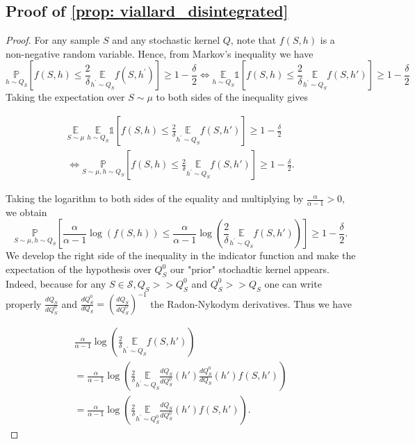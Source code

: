 \begin{noaddcontents}
\subsection{Proof of \cref{prop: viallard_disintegrated} }


\begin{proof}[Proof]
 For any sample $S$ and any stochastic kernel $Q$, note that $f(S,h)$ is a non-negative random variable. Hence, from Markov's inequality we have
$$
\underset{h \sim Q_{S}}{\mathbb{P}}\left[f(S,h) \leq \frac{2}{\delta} \underset{h^{\prime} \sim Q_{S}}{\mathbb{E}} f\left( S,h^{\prime}\right)\right] \geq 1-\frac{\delta}{2} \Longleftrightarrow
\underset{h \sim Q_{S}}{\mathbb{E}} \mathds{1}\left[f(S,h) \leq \frac{2}{\delta} \underset{h^{\prime} \sim Q_{S}}{\mathbb{E}} f\left(S,h'\right)\right] \geq 1-\frac{\delta}{2}
$$
Taking the expectation over $S \sim \mu$ to both sides of the inequality gives

\begin{multline*}
\underset{S \sim \mu}{\mathbb{E}}\; \underset{h \sim Q_{S}}{\mathbb{E}} \mathds{1}\left[f(S,h) \leq \frac{2}{\delta} \underset{h^{\prime} \sim Q_{S}}{\mathbb{E}} f(S,h')\right] \geq 1-\frac{\delta}{2} \\
\Longleftrightarrow
\underset{S \sim \mu, h \sim Q_{S}}{\mathbb{P}}\left[f(S,h) \leq \frac{2}{\delta} \underset{h^{\prime} \sim Q_{S}}{\mathbb{E}} f(S,h')\right] \geq 1-\frac{\delta}{2}.
\end{multline*}

Taking the logarithm to both sides of the equality and multiplying by $\frac{\alpha}{\alpha-1}>0$, we obtain
$$
\underset{S \sim \mu, h \sim Q_{S}}{\mathbb{P}}\left[\frac{\alpha}{\alpha-1} \log (f(S,h)) \leq \frac{\alpha}{\alpha-1} \log \left(\frac{2}{\delta} \underset{h^{\prime} \sim Q_{S}}{\mathbb{E}} f(S,h')\right)\right] \geq 1-\frac{\delta}{2} .
$$
We develop the right side of the inequality in the indicator function and make the expectation of the hypothesis over $Q_S^0$ our "prior" stochadtic kernel appears. Indeed, because for any $S\in\mathcal{S}, Q_S>> Q_S^0$ and $Q_S^0>> Q_S$ one can write properly $\frac{dQ_S}{dQ_S^0}$ and $ \frac{dQ_S^0}{dQ_S} = \left( \frac{dQ_S}{dQ_S^0}\right)^{-1}$ the Radon-Nykodym derivatives. Thus we have

\begin{multline*}
 \frac{\alpha}{\alpha-1} \log \left(\frac{2}{\delta} \underset{h^{\prime} \sim Q_{S}}{\mathbb{E}} f(S,h')\right) \\ =\frac{\alpha}{\alpha-1} \log \left(\frac{2}{\delta} \underset{h^{\prime} \sim Q_{S}}{\mathbb{E}} \frac{dQ_S}{dQ_S^0}(h')\frac{dQ_S^0}{dQ_S}(h') f(S,h') \right) \\
 =\frac{\alpha}{\alpha-1} \log \left(\frac{2}{\delta} \underset{h^{\prime} \sim Q_S^0}{\mathbb{E}} \frac{dQ_S}{dQ_S^0}(h') f(S,h')\right) .
\end{multline*}


\end{proof}
\end{noaddcontents}

